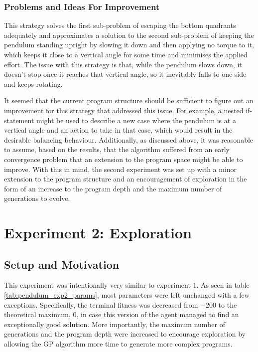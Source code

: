 \subsubsection{Problems and Ideas For Improvement}
This strategy solves the first sub-problem of escaping the bottom quadrants adequately and approximates a solution to the second sub-problem of keeping the pendulum standing upright by slowing it down and then applying no torque to it, which keeps it close to a vertical angle for some time and minimises the applied effort. The issue with this strategy is that, while the pendulum slows down, it doesn't stop once it reaches that vertical angle, so it inevitably falls to one side and keeps rotating.

It seemed that the current program structure should be sufficient to figure out an improvement for this strategy that addressed this issue. For example, a nested if-statement might be used to describe a new case where the pendulum is at a vertical angle and an action to take in that case, which would result in the desirable balancing behaviour. Additionally, as discussed above, it was reasonable to assume, based on the results, that the algorithm suffered from an early convergence problem that an extension to the program space might be able to improve. With this in mind, the second experiment was set up with a minor extension to the program structure and an encouragement of exploration in the form of an increase to the program depth and the maximum number of generations to evolve.

\section{Experiment 2: Exploration}

\subsection{Setup and Motivation}
This experiment was intentionally very similar to experiment 1. As seen in table \ref{tab:pendulum_exp2_params}, most parameters were left unchanged with a few exceptions. Specifically, the terminal fitness was decreased from $-200$ to the theoretical maximum, $0$, in case this version of the agent managed to find an exceptionally good solution. More importantly, the maximum number of generations and the program depth were increased to encourage exploration by allowing the GP algorithm more time to generate more complex programs.

